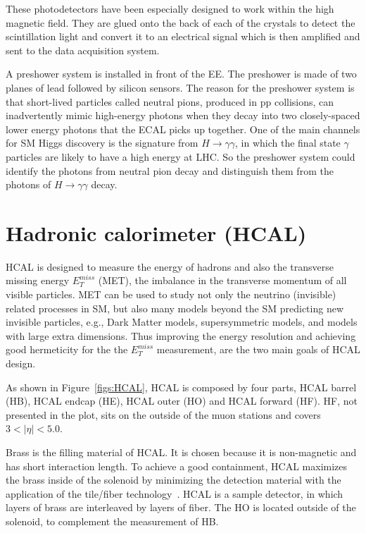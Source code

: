   
These photodetectors have been especially designed to work within the high magnetic field. They are glued onto the back of each of the crystals to detect the scintillation light and convert it to an electrical signal which is then amplified and sent to the data acquisition system.
 
 A preshower system is installed in front of the EE.  
The preshower is made of two planes of lead followed by silicon sensors. 
The reason for the preshower system is that short-lived particles called neutral pions, produced in pp collisions, can inadvertently mimic high-energy photons when they decay into two closely-spaced lower energy photons that the ECAL picks up together. 
One of the main channels for SM Higgs discovery is the signature from $H \to \gamma \gamma$, 
in which the final state $\gamma$ particles are likely to have a high energy at LHC. 
So the preshower system could identify the photons from neutral pion decay and distinguish them from the photons of $H \to \gamma \gamma$  decay.
  

  \section{Hadronic calorimeter (HCAL)}
  
HCAL is designed to measure the energy of hadrons and also the transverse
missing energy $E_{T}^{miss}$ (MET), the imbalance in the transverse momentum
of all visible particles.  
MET can be used to study not only the neutrino (invisible) related processes in SM, but also 
many models  beyond the SM predicting new invisible particles, e.g., Dark Matter models, supersymmetric models, and models with large extra dimensions.    
 Thus improving the energy resolution and achieving good hermeticity for
the the $E_{T}^{miss}$ measurement, are the two main goals of HCAL design. 
 
As shown in Figure~\ref{figs:HCAL},  HCAL is composed by four parts, HCAL barrel (HB), HCAL endcap (HE), HCAL outer (HO) and HCAL forward (HF).  HF, not presented in the plot, sits on the outside of the muon stations and covers $3 <  |\eta| < 5.0$.  

Brass is the filling material of HCAL.  
It is chosen because it is non-magnetic and has short interaction length. To achieve a good containment, HCAL maximizes the brass inside of the solenoid by
minimizing the detection material with the application of the tile/fiber technology~\cite{expBook}. HCAL is a sample detector, in which layers of brass are interleaved by layers of fiber. 
The HO is located outside of the solenoid, to complement the measurement of HB. 

